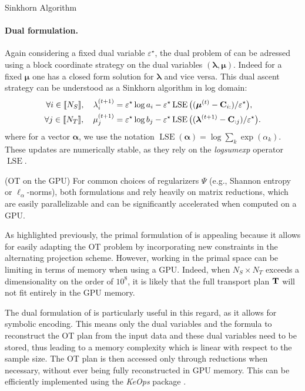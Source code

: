 \begin{mem1}{Sinkhorn Algorithm}
    \paragraph{Dual formulation.} Again considering a fixed dual variable $\varepsilon^\star$, the dual problem of  can be adressed using a block coordinate strategy on the dual variables $(\bm{\lambda}, \bm{\mu})$. Indeed for a fixed $\bm{\mu}$ one has a closed form solution for $\bm{\lambda}$ and vice versa. This dual ascent strategy can be understood as a Sinkhorn algorithm in log domain:
    \begin{align}
        \forall i \in {[\![N_S]\!]}, \quad \lambda^{(t+1)}_i &= \varepsilon^\star \log a_i - \varepsilon^\star  \operatorname{LSE} \big((\bm{\mu}^{(t)} - \mathbf{C}_{i:}) / \varepsilon^\star \big), \\
        \forall j \in {[\![N_T]\!]}, \quad \mu^{(t+1)}_j &= \varepsilon^\star \log b_j - \varepsilon^\star  \operatorname{LSE} \big((\bm{\lambda}^{(t+1)} - \mathbf{C}_{:j}) / \varepsilon^\star \big).
    \end{align}
    where for a vector $\bm{\alpha}$, we use the notation
    $\operatorname{LSE}(\bm{\alpha}) = \log \sum_{k} \exp (\alpha_k)$. These updates are numerically stable, as they rely on the \emph{logsumexp} operator $\operatorname{LSE}$.
\end{mem1}

\begin{remark}{(OT on the GPU)}\label{remark:ot_gpu}
    For common choices of regularizers $\Psi$ (e.g., Shannon entropy or $\ell_\alpha$-norms), both formulations  and  rely heavily on matrix reductions, which are easily parallelizable and can be significantly accelerated when computed on a GPU.
    
    As highlighted previously, the primal formulation of  is appealing because it allows for easily adapting the OT problem by incorporating new constraints in the alternating projection scheme. However, working in the primal space can be limiting in terms of memory when using a GPU. Indeed, when $N_S \times N_T$ exceeds a dimensionality on the order of $10^8$, it is likely that the full transport plan ${\mathbf{T}}$ will not fit entirely in the GPU memory.
    
    The dual formulation of  is particularly useful in this regard, as it allows for symbolic encoding. This means only the dual variables and the formula to reconstruct the OT plan from the input data and these dual variables need to be stored, thus leading to a memory complexity which is linear with respect to the sample size. The OT plan is then accessed only through reductions when necessary, without ever being fully reconstructed in GPU memory. This can be efficiently implemented using the \emph{KeOps} package \citep{charlier2021kernel}.
\end{remark}
    
